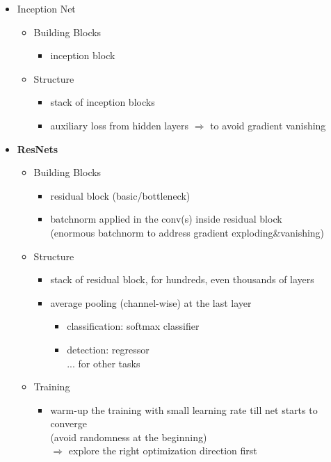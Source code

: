 \begin{itemize}
\item Inception Net
	\begin{itemize}
	\item Building Blocks
		\begin{itemize}
		\item inception block
		\end{itemize}
	\item Structure
		\begin{itemize}
		\item stack of inception blocks
		\item auxiliary loss from hidden layers $\Rightarrow$ to avoid gradient vanishing
		\end{itemize}
	\end{itemize}

\item \textbf{ResNets}
	\begin{itemize}
	\item Building Blocks
		\begin{itemize}
		\item residual block (basic/bottleneck)
		\item batchnorm applied in the conv(s) inside residual block \\
		(enormous batchnorm to address gradient exploding\&vanishing)
		\end{itemize}
	\item Structure
		\begin{itemize}
		\item stack of residual block, for hundreds, even thousands of layers
		\item average pooling (channel-wise) at the last layer
			\begin{itemize}
			\item classification: softmax classifier
			\item detection: regressor \\
			... for other tasks
			\end{itemize}
		\end{itemize}
	\item Training
		\begin{itemize}
		\item warm-up the training with small learning rate till net starts to converge \\
		(avoid randomness at the beginning) \\
		$\Rightarrow$ explore the right optimization direction first
		\end{itemize}

\end{itemize}
\end{itemize}
